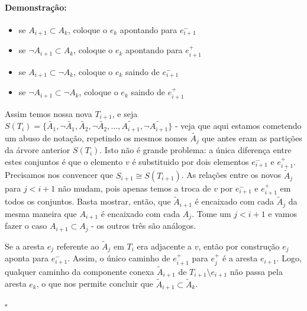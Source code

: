 \documentclass[11pt]{article}
\newcommand{\pulinho}{\vspace{.5cm}}
\theoremstyle{definition}
\theoremstyle{definition}
\theoremstyle{definition}
\theoremstyle{definition}
\theoremstyle{definition}
\theoremstyle{definition}
\theoremstyle{definition}
\theoremstyle{definition}
\theoremstyle{definition}
\theoremstyle{definition}
\theoremstyle{definition}
\theoremstyle{definition}
\newenvironment{prova}{\paragraph{Demonstração:}}{\hfill$\square$ 
\pulinho
}
\theoremstyle{definition}
\theoremstyle{definition}
\begin{document}
\begin{prova}
\begin{itemize}[label=]
  \item se $A_{i+1} \subset A_k$, coloque o $e_k$ apontando para $e_{i+1}^-$ 
  \item se $\lnot A_{i+1} \subset A_k$, coloque o $e_k$ apontando para $e_{i+1}^+$ 
  \item se $A_{i+1} \subset \lnot A_k$, coloque o $e_k$ saindo de $e_{i+1}^-$ 
  \item se $\lnot A_{i+1} \subset \lnot A_k$, coloque o $e_k$ saindo de $e_{i+1}^+$ 
\end{itemize}

Assim temos nossa nova $T_{i+1}$, e seja $S(T_i) = \{\tilde{A_1},\lnot \tilde{A_1}, \tilde{A_2}, \lnot \tilde{A_2}, \dots, \widetilde{A_{i+1}}, \lnot \widetilde{A_{i+1}}\}$ - veja que aqui estamos cometendo um abuso de notação, repetindo os mesmos nomes $\tilde{A_j}$ que antes eram as partições da árvore anterior $S(T_i)$. Isto não é grande problema: a única diferença entre estes conjuntos é que o elemento $v$ é substituido por dois elementos $e_{i+1}^-$ e $e_{i+1}^+$. Precisamos nos convencer que $S_{i+1} \cong S(T_{i+1})$. As relações entre os novos $\tilde{A}_j$ para $j < i+1$ não mudam, pois apenas temos a troca de $v$ por $e_{i+1}^-$ e $e_{i+1}^+$ em todos os conjuntos. Basta mostrar, então, que $\widetilde{A}_{i+1}$ é encaixado com cada $\tilde{A}_j$ da mesma maneira que $A_{i+1}$ é encaixado com cada $A_j$. Tome um $j < i + 1$ e vamos fazer o caso $A_{i+1} \subset A_j$ - os outros três são análogos.

Se a aresta $e_j$ referente ao $\tilde{A}_j$ em $T_i$ era adjacente a $v$, então por construção $e_j$ aponta para $e_{i+1}^-$. Assim, o único caminho de $e_{i+1}^+$ para $e_j^+$ é a aresta $e_{i+1}$. Logo, qualquer caminho da componente conexa $\tilde{A}_{i+1}$ de $T_{i+1} \setminus e_{i+1}$ não passa pela aresta $e_k$, o que nos permite concluir que $\tilde{A}_{i+1} \subset \tilde{A}_k$.


\end{prova}
\end{document}
